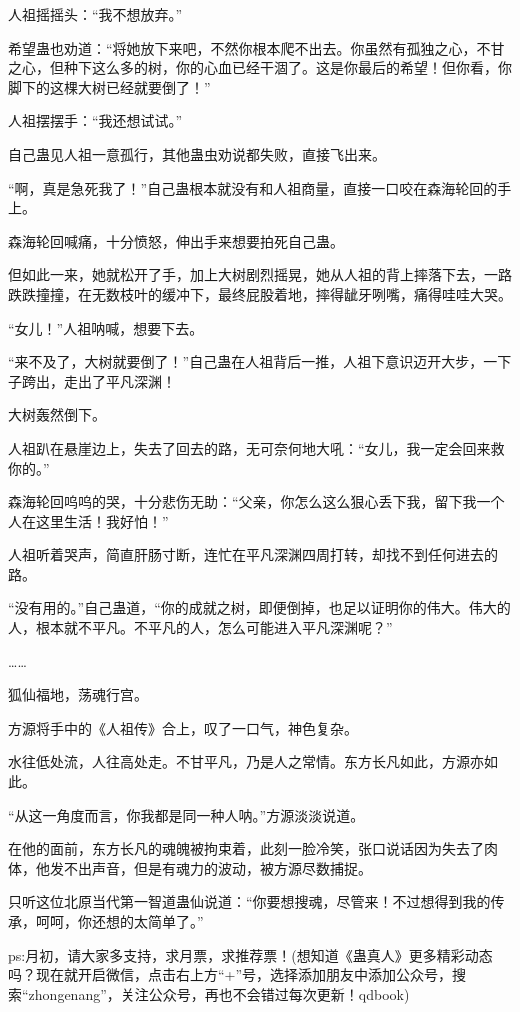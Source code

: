 \begin{this_body}
人祖摇摇头：“我不想放弃。”

希望蛊也劝道：“将她放下来吧，不然你根本爬不出去。你虽然有孤独之心，不甘之心，但种下这么多的树，你的心血已经干涸了。这是你最后的希望！但你看，你脚下的这棵大树已经就要倒了！”

人祖摆摆手：“我还想试试。”

自己蛊见人祖一意孤行，其他蛊虫劝说都失败，直接飞出来。

“啊，真是急死我了！”自己蛊根本就没有和人祖商量，直接一口咬在森海轮回的手上。

森海轮回喊痛，十分愤怒，伸出手来想要拍死自己蛊。

但如此一来，她就松开了手，加上大树剧烈摇晃，她从人祖的背上摔落下去，一路跌跌撞撞，在无数枝叶的缓冲下，最终屁股着地，摔得龇牙咧嘴，痛得哇哇大哭。

“女儿！”人祖呐喊，想要下去。

“来不及了，大树就要倒了！”自己蛊在人祖背后一推，人祖下意识迈开大步，一下子跨出，走出了平凡深渊！

大树轰然倒下。

人祖趴在悬崖边上，失去了回去的路，无可奈何地大吼：“女儿，我一定会回来救你的。”

森海轮回呜呜的哭，十分悲伤无助：“父亲，你怎么这么狠心丢下我，留下我一个人在这里生活！我好怕！”

人祖听着哭声，简直肝肠寸断，连忙在平凡深渊四周打转，却找不到任何进去的路。

“没有用的。”自己蛊道，“你的成就之树，即便倒掉，也足以证明你的伟大。伟大的人，根本就不平凡。不平凡的人，怎么可能进入平凡深渊呢？”

……

狐仙福地，荡魂行宫。

方源将手中的《人祖传》合上，叹了一口气，神色复杂。

水往低处流，人往高处走。不甘平凡，乃是人之常情。东方长凡如此，方源亦如此。

“从这一角度而言，你我都是同一种人呐。”方源淡淡说道。

在他的面前，东方长凡的魂魄被拘束着，此刻一脸冷笑，张口说话因为失去了肉体，他发不出声音，但是有魂力的波动，被方源尽数捕捉。

只听这位北原当代第一智道蛊仙说道：“你要想搜魂，尽管来！不过想得到我的传承，呵呵，你还想的太简单了。”

ps:月初，请大家多支持，求月票，求推荐票！(想知道《蛊真人》更多精彩动态吗？现在就开启微信，点击右上方“+”号，选择添加朋友中添加公众号，搜索“zhongenang”，关注公众号，再也不会错过每次更新！qdbook)

\end{this_body}

